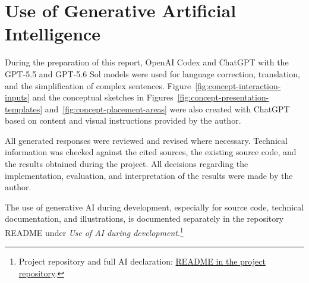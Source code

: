 \chapter{Use of Generative Artificial Intelligence}
\label{generative-ai}

\begingroup
\setlength{\emergencystretch}{3em}
During the preparation of this report, OpenAI Codex and ChatGPT with the GPT-5.5 and GPT-5.6 Sol models were used for language correction, translation, and the simplification of complex sentences. Figure~\ref{fig:concept-interaction-inputs} and the conceptual sketches in Figures~\ref{fig:concept-presentation-templates} and~\ref{fig:concept-placement-areas} were also created with ChatGPT based on content and visual instructions provided by the author.

All generated responses were reviewed and revised where necessary. Technical information was checked against the cited sources, the existing source code, and the results obtained during the project. All decisions regarding the implementation, evaluation, and interpretation of the results were made by the author.

The use of generative AI during development, especially for source code, technical documentation, and illustrations, is documented separately in the repository README under \emph{Use of AI during development}.\footnote{Project repository and full AI declaration: \href{https://github.com/jannick1312/BCs-VR-Museum/blob/main/README.md}{README in the project repository}.}

\endgroup
